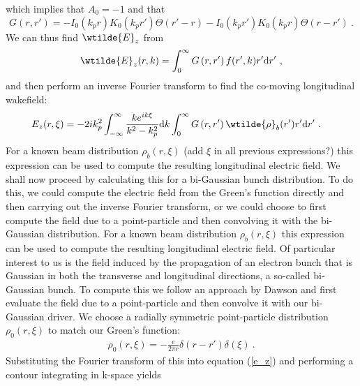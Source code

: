 \documentclass[%
onecolumn, notitlepage,
 amsmath,amssymb,
 aps,
]{article}
\begin{document}
which implies that $A_0=-1$ and that
\begin{equation}
G\left(r,r'\right)=- I_0(k_pr)K_0(k_pr')\Theta(r'-r)-I_0(k_pr')K_0(k_pr)\Theta(r-r')~.
\end{equation}
We can thus find $\wtilde{E}_z$ from 
\begin{equation}
\wtilde{E}_z(r,k)=\int_{0}^{\infty}G\left(r,r'\right)f(r',k)r'\mathrm{d}r'~,
\end{equation}
and then perform an inverse Fourier transform to find the co-moving longitudinal wakefield:
\begin{align}
E_z(r,\xi)&=-{2ik_p^2}\int_{-\infty}^{\infty}\frac{ke^{ik\xi}}{k^2-k_p^2}\mathrm{d}k\int_0^{\infty}G\left(r,r'\right)\wtilde{\rho}_b(r')r'\mathrm{d}r'~.
\label{e_z}
\end{align}
For a known beam distribution $\rho_b(r,\xi)$ (add $\xi$ in all previous expressions?) this expression can be used to compute the resulting longitudinal electric field. We shall now proceed by calculating this for a bi-Gaussian bunch distribution. To do this, we could compute the electric field from the Green's function directly and then carrying out the inverse Fourier transform, or we could choose to first compute the field due to a point-particle and then convolving it with the bi-Gaussian distribution. 
For a known beam distribution $\rho_b(r,\xi)$ this expression can be used to compute the resulting longitudinal electric field. Of particular interest to us is the field induced by the propagation of an electron bunch that is Gaussian in both the transverse and longitudinal directions, a so-called bi-Gaussian bunch. To compute this we follow an approach by Dawson \cite{Katsouleas1987} and first evaluate the field due to a point-particle and then convolve it with our bi-Gaussian driver. We choose a radially symmetric point-particle distribution ${\rho}_{0}(r,\xi)$ to match our Green's function:
\begin{align}
{\rho}_{0}(r,\xi)=-\frac{e}{2\pi r}\delta(r-r')\delta(\xi)~. %
\end{align}
Substituting the Fourier transform of this into equation (\ref{e_z}) and performing a contour integrating in k-space yields 
\end{document}
